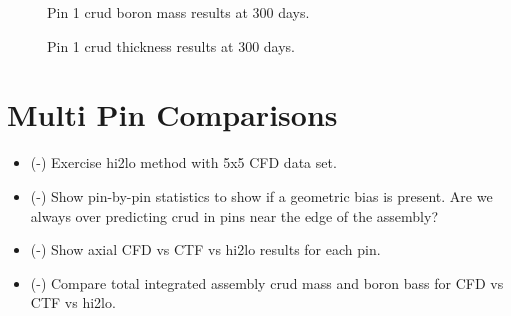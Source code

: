 \begin{figure}[H]%
    \centering
    \qquad
    \caption{Pin 1 crud boron mass results at 300 days.}%
    \label{fig:hi2loimppinzbmass}
\end{figure}


\begin{figure}[H]%
    \centering
    \qquad
    \caption{Pin 1 crud thickness results at 300 days.}%
    \label{fig:hi2loimppinzcthick}
\end{figure}



\section{Multi Pin Comparisons}

\begin{itemize}
    \item (\checkmark-) Exercise hi2lo method with 5x5 CFD data set.
    \item (\checkmark-) Show pin-by-pin statistics to show if a geometric bias is present.  Are we always over predicting crud
    in pins near the edge of the assembly?
    \item (\checkmark-) Show axial CFD vs CTF vs hi2lo results for each pin.
    \item (\checkmark-) Compare total integrated assembly crud mass and boron bass for CFD vs CTF vs hi2lo.
\end{itemize}

